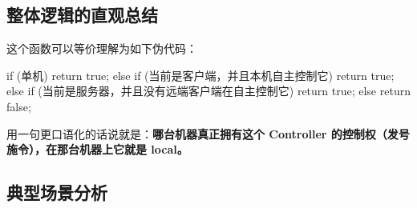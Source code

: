 \subsection{整体逻辑的直观总结}

这个函数可以等价理解为如下伪代码：

\begin{code}
	if (单机)
	return true;
	else if (当前是客户端，并且本机自主控制它)
	return true;
	else if (当前是服务器，并且没有远端客户端在自主控制它)
	return true;
	else
	return false;
\end{code}

用一句更口语化的话说就是：\textbf{哪台机器真正拥有这个 Controller 的控制权（发号施令），在那台机器上它就是 local。}

\subsection{典型场景分析}

